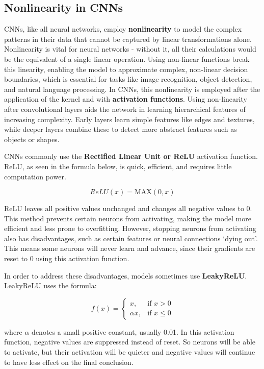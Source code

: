     \subsection{Nonlinearity in CNNs}
        CNNs, like all neural networks, employ \textbf{nonlinearity} to model the complex patterns in their data that cannot be captured by linear transformations alone. Nonlinearity is vital for neural networks - without it, all their calculations would be the equivalent of a single linear operation. Using non-linear functions break this linearity, enabling the model to approximate complex, non-linear decision boundaries, which is essential for tasks like image recognition, object detection, and natural language processing. In CNNs, this nonlinearity is employed after the application of the kernel and with \textbf{activation functions}. Using non-linearity after convolutional layers aids the network in learning hierarchical features of increasing complexity. Early layers learn simple features like edges and textures, while deeper layers combine these to detect more abstract features such as objects or shapes. 

        CNNs commonly use the \textbf{Rectified Linear Unit or ReLU} activation function. ReLU, as seen in the formula below, is quick, efficient, and requires little computation power. 
        
        $$ReLU(x) = \mathrm{MAX}(0,x)$$
        
        ReLU leaves all positive values unchanged and changes all negative values to 0. This method prevents certain neurons from activating, making the model more efficient and less prone to overfitting. However, stopping neurons from activating also has disadvantages, such as certain features or neural connections `dying out'. This means some neurons will never learn and advance, since their gradients are reset to 0 using this activation function. 

        In order to address these disadvantages, models sometimes use \textbf{LeakyReLU}. LeakyReLU uses the formula:

        \[f(x)= 
        \begin{cases}
            x,& \text{if } x > 0\\
            \alpha x, & \text{if } x \leq 0
        \end{cases}
        \]

        where $\alpha$ denotes a small positive constant, usually 0.01. In this activation function, negative values are suppressed instead of reset. So neurons will be able to activate, but their activation will be quieter and negative values will continue to have less effect on the final conclusion.

